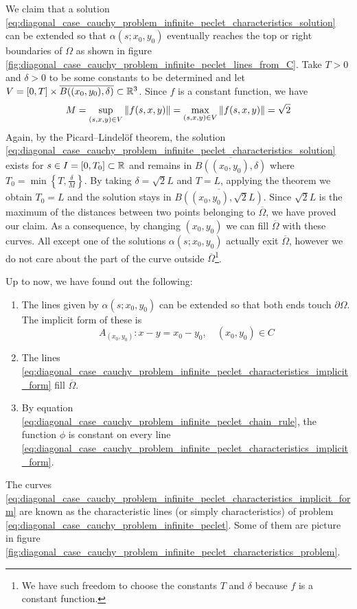We claim that a solution
\eqref{eq:diagonal_case_cauchy_problem_infinite_peclet_characteristics_solution}
can be extended so that $\alpha(s;x_0,y_0)$ eventually reaches the top or right
boundaries of $\Omega$ as shown in figure
\ref{fig:diagonal_case_cauchy_problem_infinite_peclet_lines_from_C}. Take $T >
0$ and $\delta > 0$ to be some constants to be determined and let $V = [0, T]
\times \overline{B((x_0,y_0), \delta)} \subset \mathbb{R}^3$. Since $f$ is a constant
function, we have
\begin{equation*}
	M = 
	\sup_{(s,x,y) \in V} \norm{f(s,x,y)} = 
	\max_{(s,x,y) \in V} \norm{f(s,x,y)} = 
	\sqrt{2}
\end{equation*} 
Again, by the Picard--Lindelöf theorem, the solution
\eqref{eq:diagonal_case_cauchy_problem_infinite_peclet_characteristics_solution}
exists for $s \in I = [0, T_0] \subset \mathbb{R}$ and remains in
$\overline{B((x_0,y_0), \delta)}$ where $T_0 = \min{\left\{ T, \frac{\delta}{M}
\right\}}$. By taking $\delta = \sqrt{2} L$ and $T = L$, applying the theorem we
obtain $T_0 = L$ and the solution stays in $\overline{B((x_0,y_0), \sqrt{2}
L)}$. Since $\sqrt{2} L$ is the maximum of the distances between two points
belonging to $\overline{\Omega}$, we have proved our claim. As a consequence, by
changing $(x_0,y_0)$ we can fill $\overline{\Omega}$ with these curves. All
except one of the solutions $\alpha(s;x_0,y_0)$ actually exit
$\overline{\Omega}$, however we do not care about the part of the curve outside
$\overline{\Omega}$\footnote{We have such freedom to choose the constants $T$
and $\delta$ because $f$ is a constant function.}.

Up to now, we have found out the following:
\begin{enumerate}[label={(\roman*)}, topsep=0pt]
	\item The lines given by $\alpha(s;x_0,y_0)$ can be extended so that both
	ends touch $\partial \Omega$. The implicit form of these is
	\begin{equation} \label{eq:diagonal_case_cauchy_problem_infinite_peclet_characteristics_implicit_form}
		A_{(x_0,y_0)} \colon x - y = x_0 - y_0, \quad (x_0,y_0) \in C
	\end{equation}
	\item The lines
	\eqref{eq:diagonal_case_cauchy_problem_infinite_peclet_characteristics_implicit_form}
	fill $\overline{\Omega}$.
	\item By equation
	\eqref{eq:diagonal_case_cauchy_problem_infinite_peclet_chain_rule}, the
	function $\phi$ is constant on every line
	\eqref{eq:diagonal_case_cauchy_problem_infinite_peclet_characteristics_implicit_form}.
	\label{eq:infinite_peclet_point_2}
\end{enumerate}
The curves
\eqref{eq:diagonal_case_cauchy_problem_infinite_peclet_characteristics_implicit_form}
are known as the characteristic lines (or simply characteristics) of problem
\eqref{eq:diagonal_case_cauchy_problem_infinite_peclet}. Some of them are
picture in figure
\ref{fig:diagonal_case_cauchy_problem_infinite_peclet_characteristics_problem}.

